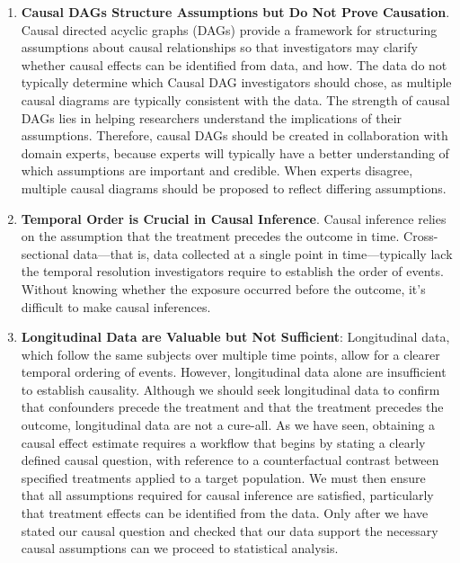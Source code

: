 \documentclass[
  singlecolumn]{article}
\providecommand{\tightlist}{%
  \setlength{\itemsep}{0pt}\setlength{\parskip}{0pt}}\usepackage{longtable,booktabs,array}
\begin{document}
\begin{enumerate}
\def\labelenumi{\arabic{enumi}.}
\tightlist
\item
  \textbf{Causal DAGs Structure Assumptions but Do Not Prove Causation}.
  Causal directed acyclic graphs (DAGs) provide a framework for
  structuring assumptions about causal relationships so that
  investigators may clarify whether causal effects can be identified
  from data, and how. The data do not typically determine which Causal
  DAG investigators should chose, as multiple causal diagrams are
  typically consistent with the data. The strength of causal DAGs lies
  in helping researchers understand the implications of their
  assumptions. Therefore, causal DAGs should be created in collaboration
  with domain experts, because experts will typically have a better
  understanding of which assumptions are important and credible. When
  experts disagree, multiple causal diagrams should be proposed to
  reflect differing assumptions.
\item
  \textbf{Temporal Order is Crucial in Causal Inference}. Causal
  inference relies on the assumption that the treatment precedes the
  outcome in time. Cross-sectional data---that is, data collected at a
  single point in time---typically lack the temporal resolution
  investigators require to establish the order of events. Without
  knowing whether the exposure occurred before the outcome, it's
  difficult to make causal inferences.
\item
  \textbf{Longitudinal Data are Valuable but Not Sufficient}:
  Longitudinal data, which follow the same subjects over multiple time
  points, allow for a clearer temporal ordering of events. However,
  longitudinal data alone are insufficient to establish causality.
  Although we should seek longitudinal data to confirm that confounders
  precede the treatment and that the treatment precedes the outcome,
  longitudinal data are not a cure-all. As we have seen, obtaining a
  causal effect estimate requires a workflow that begins by stating a
  clearly defined causal question, with reference to a counterfactual
  contrast between specified treatments applied to a target population.
  We must then ensure that all assumptions required for causal inference
  are satisfied, particularly that treatment effects can be identified
  from the data. Only after we have stated our causal question and
  checked that our data support the necessary causal assumptions can we
  proceed to statistical analysis.
\end{enumerate}
\end{document}
